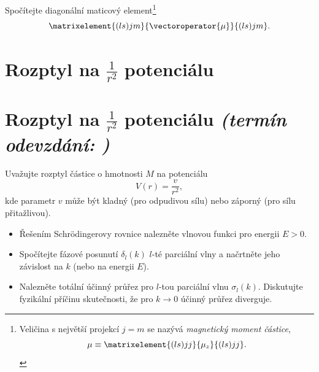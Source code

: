 \documentclass[a4paper,11pt,twoside]{book}
\def\np{\newpage}
\newcommand{\exercise}[2][]{\ifthenelse{\isempty{#1}}
	{\np\section{#2}}
	{\np\section[#2]{{#2} \small{\it{(termín odevzdání: {#1})}}}}
}
\begin{document}
	Spočítejte diagonální maticový element\footnote{
		Veličina s největší projekcí $j=m$ se nazývá \emph{magnetický moment částice},
		\begin{equation*}
			\mu\equiv\matrixelement{(ls)jj}{\mu_{z}}{(ls)jj}.
		\end{equation*}
	}
	\begin{equation*}
		\matrixelement{(ls)jm}{\vectoroperator{\mu}}{(ls)jm}.
	\end{equation*}

\exercise{Rozptyl na $\frac{1}{r^{2}}$ potenciálu}
    Uvažujte rozptyl částice o hmotnosti $M$ na potenciálu
    \begin{equation*}
        V(r)=\frac{v}{r^{2}},
    \end{equation*}
    kde parametr $v$ může být kladný (pro odpudivou sílu) nebo záporný (pro sílu přitažlivou).
    
    \begin{itemize}
        \item 
            Řešením Schrödingerovy rovnice nalezněte vlnovou funkci pro energii $E>0$.
            
        \item
            Spočítejte fázové posunutí $\delta_{l}(k)$ $l$-té parciální vlny 
            a načrtněte jeho závislost na $k$ (nebo na energii $E$).
            
        \item
            Nalezněte totální účinný průřez pro $l$-tou parciální vlnu $\sigma_{l}(k)$.
            Diskutujte fyzikální příčinu skutečnosti, že pro $k\rightarrow0$ účinný průřez diverguje.
    \end{itemize}    
    
\end{document}
